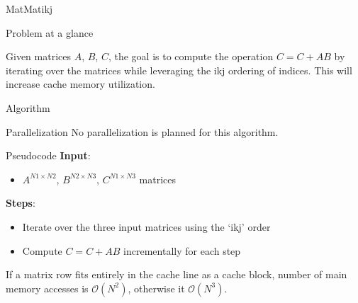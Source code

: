 \begin{chapter}{MatMatikj}
    \begin{section}{Problem at a glance}
        \par Given matrices $A$, $B$, $C$, the goal is to compute the  operation $C = C + AB$ by iterating over the matrices while leveraging the ikj ordering of indices. This will increase cache memory utilization.
    \end{section}
    \begin{section}{Algorithm}
        \begin{subsection}{Parallelization}
            No parallelization is planned for this algorithm.
        \end{subsection}
        \begin{subsection}{Pseudocode}
            \textbf{Input}:
            \begin{itemize}
                \item $A^{N1 \times N2}$, $B^{N2 \times N3}$, $C^{N1 \times N3}$ matrices
            \end{itemize}
            \textbf{Steps}:
            \begin{itemize}
                \item Iterate over the three input matrices using the `ikj' order
                \item Compute $C = C + AB$ incrementally for each step
            \end{itemize}
            
        \end{subsection}
    \end{section}
    If a matrix row fits entirely in the cache line as a cache block, number of main memory accesses is $\mathcal{O}(N^2)$, otherwise it $\mathcal{O}(N^3)$.
\end{chapter}